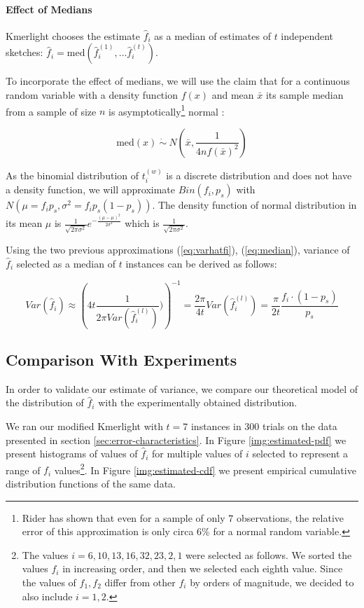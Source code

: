 \paragraph{Effect of Medians}
Kmerlight chooses the estimate $\hat f_i$ as a median of estimates of $t$ 
independent sketches: $\hat f_i = \mathrm{med}(\hat f_i^{(1)}, \dots \hat f_i^{(t)})$.

To incorporate the effect of medians, we will use the claim that for a continuous random
variable with a density function $f(x)$ and mean $\bar x$ its sample median from a sample of
size $n$ is asymptotically\footnote{Rider \cite{Rider1960} has shown that 
even for a sample of only $7$ observations, the relative error of this approximation is only
circa 6\% for a normal random variable.} normal \cite{WikiMedian}:

\begin{equation} \label{eq:median}
\mathrm{med}(x) ~\dot\sim~ N\left(\bar x, \frac{1}{4nf(\bar x)^2}\right)
\end{equation}

As the binomial distribution of $t_i^{(w)}$ is a discrete distribution and does
not have a density function, we will approximate $Bin(f_i, p_s)$ with
$N(\mu = f_i p_s, \sigma^2 = f_i p_s(1-p_s))$. The density function of normal distribution
in its mean $\mu$ is $\frac{1}{\sqrt{2\pi\sigma^2}} e^{-\frac{(\mu - \mu)^2}{2\sigma^2}}$
which is $\frac{1}{\sqrt{2\pi\sigma^2}}$.

Using the two previous approximations (\ref{eq:varhatfi}), (\ref{eq:median}), 
variance of $\hat f_i$ selected as a median of $t$ instances can be derived as follows:

\begin{equation} \label{eq:variance}
Var(\hat f_i) \approx \left( 4t\frac{1}{2\pi Var(\hat f_i^{(l)})}) \right)^{-1} =
\frac{2\pi}{4t} Var(\hat f_i^{(l)}) = \frac{\pi}{2t} \frac{f_i \cdot (1 - p_s)}{p_s}
\end{equation}


\subsection{Comparison With Experiments}
\label{sec:variance-experiments}
In order to validate our estimate of variance, we compare our theoretical model of the distribution 
of $\hat f_i$ with the experimentally obtained distribution.

We ran our modified Kmerlight with $t=7$ instances in 300 trials on the data presented in 
section \ref{sec:error-characteristics}. In Figure \ref{img:estimated-pdf}
we present histograms of values of $\hat f_i$ for multiple values of $i$ selected to represent
a range of $f_i$ values\footnote{The values $i = 6,10,13,16,32,23,2,1$ were selected
as follows. We sorted the values $f_i$ in increasing order, and then we selected
each eighth value. Since the values of $f_1, f_2$ differ from other $f_i$ by orders
of magnitude, we decided to also include $i=1,2$.}.
In Figure \ref{img:estimated-cdf} we present empirical cumulative 
distribution functions of the same data. 

